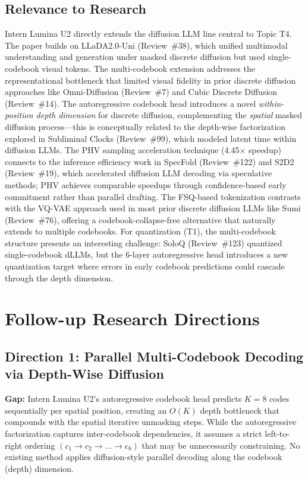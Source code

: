 \documentclass[11pt,a4paper]{article}
\begin{document}
\subsection{Relevance to Research}
Intern Lumina U2 directly extends the diffusion LLM line central to Topic T4. The paper builds on LLaDA2.0-Uni (Review~\#38), which unified multimodal understanding and generation under masked discrete diffusion but used single-codebook visual tokens. The multi-codebook extension addresses the representational bottleneck that limited visual fidelity in prior discrete diffusion approaches like Omni-Diffusion (Review~\#7) and Cubic Discrete Diffusion (Review~\#14). The autoregressive codebook head introduces a novel \emph{within-position depth dimension} for discrete diffusion, complementing the \emph{spatial} masked diffusion process---this is conceptually related to the depth-wise factorization explored in Subliminal Clocks (Review~\#99), which modeled latent time within diffusion LLMs. The PHV sampling acceleration technique (4.45$\times$ speedup) connects to the inference efficiency work in SpecFold (Review~\#122) and S2D2 (Review~\#19), which accelerated diffusion LLM decoding via speculative methods; PHV achieves comparable speedups through confidence-based early commitment rather than parallel drafting. The FSQ-based tokenization contrasts with the VQ-VAE approach used in most prior discrete diffusion LLMs like Sumi (Review~\#76), offering a codebook-collapse-free alternative that naturally extends to multiple codebooks. For quantization (T1), the multi-codebook structure presents an interesting challenge: SoloQ (Review~\#123) quantized single-codebook dLLMs, but the 6-layer autoregressive head introduces a new quantization target where errors in early codebook predictions could cascade through the depth dimension.

\section{Follow-up Research Directions}

\subsection{Direction 1: Parallel Multi-Codebook Decoding via Depth-Wise Diffusion}
\textbf{Gap:} Intern Lumina U2's autoregressive codebook head predicts $K{=}8$ codes sequentially per spatial position, creating an $O(K)$ depth bottleneck that compounds with the spatial iterative unmasking steps. While the autoregressive factorization captures inter-codebook dependencies, it assumes a strict left-to-right ordering $(c_1 \to c_2 \to \ldots \to c_8)$ that may be unnecessarily constraining. No existing method applies diffusion-style parallel decoding along the codebook (depth) dimension.
\end{document}
